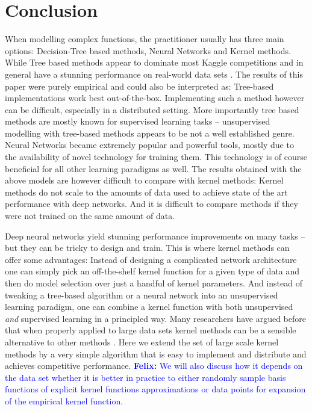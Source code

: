 \documentclass{article} %
\newcommand{\felix}[1]{\textcolor{blue}{{\bf Felix:} #1}}
\begin{document}
\section{Conclusion}
When modelling complex functions, the practitioner usually has three main options: Decision-Tree based methods, Neural Networks and Kernel methods. While Tree based methods appear to dominate most Kaggle competitions and in general have a stunning performance on real-world data sets \cite{Caruana2006}. The results of this paper were purely empirical and could also be interpreted as: Tree-based implementations work best out-of-the-box. Implementing such a method however can be difficult, especially in a distributed setting. More importantly tree based methods are mostly known for supervised learning tasks -- unsupervised modelling with tree-based methods appears to be not a well established genre. Neural Networks became extremely popular and powerful tools, mostly due to the availability of novel technology for training them. This technology is of course beneficial for all other learning paradigms as well. The results obtained with the above models are however difficult to compare with kernel methods: Kernel methods do not scale to the amounts of data used to achieve state of the art performance with deep networks. And it is difficult to compare methods if they were not trained on the same amount of data.


Deep neural networks yield stunning performance improvements on many tasks -- but they can be tricky to design and train.
This is where kernel methods can offer some advantages: Instead of designing a complicated network architecture one can simply pick an off-the-shelf kernel function for a given type of data and then do model selection over just a handful of kernel parameters. And instead of tweaking a tree-based algorithm or a neural network into an unsupervised learning paradigm, one can combine a kernel function with both unsupervised {\em and} supervised learning in a principled way.  
Many researchers have argued before that when properly applied to large data sets kernel methods can be a sensible alternative to other methods \cite{Lu2014}. Here we extend the set of large scale kernel methods by a very simple algorithm that is easy to implement and distribute and achieves competitive performance. 
\felix{We will also discuss how it depends on the data set whether it is better in practice to either randomly sample basis functions of explicit kernel functions approximations or data points for expansion of the empirical kernel function. }
\end{document}
